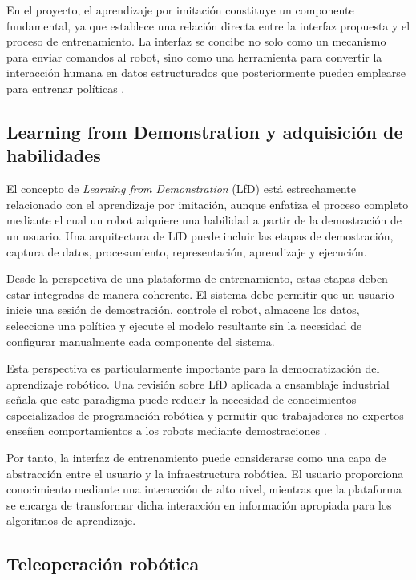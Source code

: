 \documentclass[stu,12pt,floatsintext]{apa7}
\begin{document}
En el proyecto, el aprendizaje por imitación constituye un componente fundamental, ya que establece una relación directa entre la interfaz propuesta y el proceso de entrenamiento. La interfaz se concibe no solo como un mecanismo para enviar comandos al robot, sino como una herramienta para convertir la interacción humana en datos estructurados que posteriormente pueden emplearse para entrenar políticas \parencite{zare2023surveyimitationlearningalgorithms}.

\subsection{Learning from Demonstration y adquisición de habilidades}

El concepto de \textit{Learning from Demonstration} (LfD) está estrechamente relacionado con el aprendizaje por imitación, aunque enfatiza el proceso completo mediante el cual un robot adquiere una habilidad a partir de la demostración de un usuario. Una arquitectura de LfD puede incluir las etapas de demostración, captura de datos, procesamiento, representación, aprendizaje y ejecución.

Desde la perspectiva de una plataforma de entrenamiento, estas etapas deben estar integradas de manera coherente. El sistema debe permitir que un usuario inicie una sesión de demostración, controle el robot, almacene los datos, seleccione una política y ejecute el modelo resultante sin la necesidad de configurar manualmente cada componente del sistema.

Esta perspectiva es particularmente importante para la democratización del aprendizaje robótico. Una revisión sobre LfD aplicada a ensamblaje industrial señala que este paradigma puede reducir la necesidad de conocimientos especializados de programación robótica y permitir que trabajadores no expertos enseñen comportamientos a los robots mediante demostraciones \parencite{HERNANDEZMORENO2024102658}.

Por tanto, la interfaz de entrenamiento puede considerarse como una capa de abstracción entre el usuario y la infraestructura robótica. El usuario proporciona conocimiento mediante una interacción de alto nivel, mientras que la plataforma se encarga de transformar dicha interacción en información apropiada para los algoritmos de aprendizaje.

\subsection{Teleoperación robótica}
\end{document}
